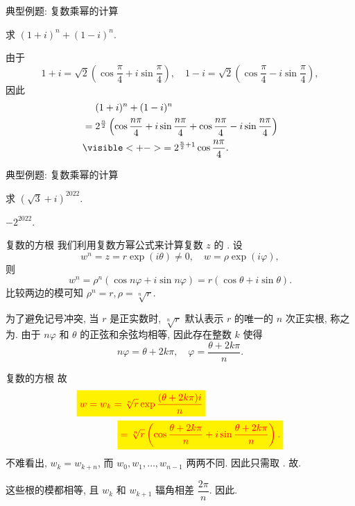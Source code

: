 \begin{frame}{典型例题: 复数乘幂的计算}
\begin{example}
求 $(1+i)^n+(1-i)^n$.
\end{example}
\begin{solution}
由于
\[1+i=\sqrt2\left(\cos\frac\pi4+i\sin\frac\pi4\right),\quad
1-i=\sqrt2\left(\cos\frac\pi4-i\sin\frac\pi4\right),\]
\onslide<+->
因此
\vspace{-\baselineskip}
\begin{align*}
&\peq(1+i)^n+(1-i)^n\\
&=2^{\frac n2}\left(\cos\frac{n\pi}4+i\sin\frac{n\pi}4+\cos\frac{n\pi}4-i\sin\frac{n\pi}4\right)\\
&\visible<+->{=2^{\frac n2+1}\cos\frac{n\pi}4.}
\end{align*}
\vspace{-\baselineskip}
\end{solution}
\end{frame}


\begin{frame}{典型例题: 复数乘幂的计算}
\begin{exercise}
求 $(\sqrt3+i)^{2022}$.
\end{exercise}
\begin{answer}
$-2^{2022}$.
\end{answer}
\end{frame}


\begin{frame}{复数的方根}
\onslide<+->
我们利用复数方幂公式来计算复数 $z$ 的 .
\onslide<+->
设
\[w^n=z=r\exp(i\theta)\neq0,\quad w=\rho\exp(i\varphi),\]
\onslide<+->
则
\[w^n=\rho^n(\cos{n\varphi}+i\sin{n\varphi})=r(\cos\theta+i\sin\theta).\]
\onslide<+->
比较两边的模可知 $\rho^n=r,\rho=\sqrt[n]r$.

\onslide<+->
为了避免记号冲突, 当 $r$ 是正实数时, $\sqrt[n]r$ 默认表示 $r$ 的唯一的 $n$ 次正实根, 称之为.
\onslide<+->
由于 $n\varphi$ 和 $\theta$ 的正弦和余弦均相等, 因此存在整数 $k$ 使得
\[n\varphi=\theta+2k\pi,\quad \varphi=\frac{\theta+2k\pi}n.\]
\end{frame}


\begin{frame}{复数的方根}
\onslide<+->
故
\begin{align*}
&\eqatt{w=w_k=\sqrt[n]r\exp\frac{(\theta+2k\pi)i}n}\\
&\hspace{42pt}\eqatt{=\sqrt[n]r\left(\cos\frac{\theta+2k\pi}n+i\sin\frac{\theta+2k\pi}n\right).}
\end{align*}
\onslide<+->
不难看出, $w_k=w_{k+n}$, 而 $w_0,w_1,\dots,w_{n-1}$ 两两不同.
\onslide<+->
因此只需取 .
\onslide<+->
故.

\onslide<+->
这些根的模都相等, 且 $w_k$ 和 $w_{k+1}$ 辐角相差 $\dfrac{2\pi}n$.
\onslide<+->
因此.
\end{frame}


